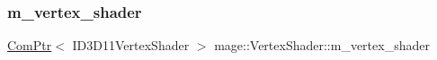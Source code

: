 \hypertarget{classmage_1_1_vertex_shader_a0b2b02abae4cb226c115d7f1c5464a54}{}\label{classmage_1_1_vertex_shader_a0b2b02abae4cb226c115d7f1c5464a54} 
\subsubsection{\texorpdfstring{m\+\_\+vertex\+\_\+shader}{m\_vertex\_shader}}
{\footnotesize\ttfamily \hyperlink{namespacemage_ae74f374780900893caa5555d1031fd79}{Com\+Ptr}$<$ I\+D3\+D11\+Vertex\+Shader $>$ mage\+::\+Vertex\+Shader\+::m\+\_\+vertex\+\_\+shader\hspace{0.3cm}{\ttfamily [protected]}}

